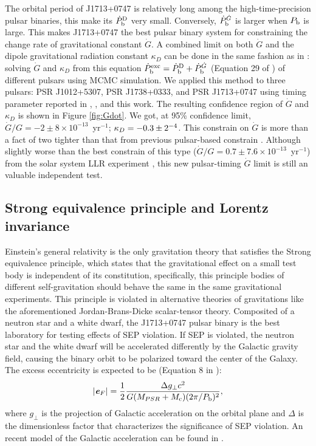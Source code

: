 The orbital period of J1713+0747 is relatively long among the
high-time-precision pulsar binaries, this make its $\dot{P}_{\rm b}^{\rm D}$
very small. Conversely, $\dot{P}_{\rm b}^{\dot{G}}$ is larger when $P_{\rm b}$
is large. This makes J1713+0747 the best pulsar binary system for constraining
the change rate of gravitational constant $\dot{G}$. A combined limit on both
$\dot{G}$ and the dipole gravitational radiation constant $\kappa_D$ can be
done in the same fashion as in \citet{lwj+09}: solving $\dot{G}$ and $\kappa_D$
from this equation $\dot{P}_{\rm b}^{\rm exc} = \dot{P}_{\rm b}^{\rm D} +
\dot{P}_{\rm b}^{\dot{G}}$ (Equation 29 of \citealt{lwj+09}) of different
pulsars using MCMC simulation. We applied this method to three pulsars: PSR J1012+5307, PSR
J1738+0333, and PSR J1713+0747 using timing parameter reported in
\citet{lwj+09}, \citet{fwe+12}, and this work.
The resulting confidence region of $\dot{G}$ and $\kappa_D$ is shown in Figure
\ref{fig:Gdot}.
We got, at 95\% confidence limit, $\dot{G}/G = -2\pm8\times10^{-13}$~yr$^{-1}$;
$\kappa_D=-0.3\pm2\time10^{-4}$. 
This constrain on $\dot{G}$ is more than a fact of two tighter than that from
previous pulsar-based constrain \citep{fwe+12}. 
Although slightly worse than
the best constrain of this type
($\dot{G}/G=0.7\pm7.6\times10^{-13}$~yr$^{-1}$) from the solar system LLR
experiment \citep{hmb10}, this new pulsar-timing  $\dot{G}$ limit is still an valuable independent test.  

\subsection{Strong equivalence principle and Lorentz invariance}
\label{sec:sep}
Einstein's general relativity is the only gravitation theory that satisfies
the Strong equivalence principle, which states that the gravitational
effect on a small test body is independent of its constitution, specifically,
this principle bodies of different self-gravitation should behave the same in
the same gravitational experiments. This principle is violated in alternative
theories of gravitations like the aforementioned Jordan-Brans-Dicke
scalar-tensor theory. Composited of a neutron star and a
white dwarf, the J1713+0747 pulsar binary is the best laboratory for testing 
effects of SEP violation. If SEP is violated, the neutron star and the white
dwarf will be accelerated differently by the Galactic gravity field, causing
the binary orbit to be polarized toward the center of the Galaxy. The excess 
eccentricity is expected to be (Equation 8 in \citealt{sns+05}):
\begin{equation}
|\textbf{\textit{e}}_F| = \frac{1}{2}\frac{\Delta g_{\bot} c^2}{G(M_{PSR}+M_{\rm
c})(2\pi/P_{\rm b})^2},
\end{equation}
where $g_{\bot}$ is the projection of Galactic acceleration on the orbital plane 
and $\Delta$ is the dimensionless factor that characterizes the significance 
of SEP violation. An recent model of the Galactic acceleration can be found in
\citealt{hf04a}.


